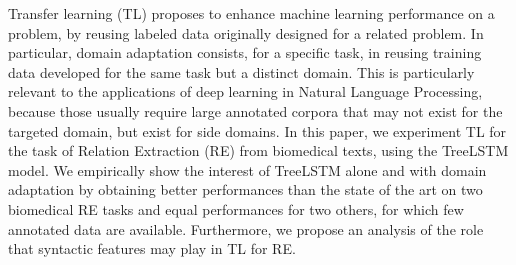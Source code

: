 Transfer learning (TL) proposes to enhance machine learning performance on a  problem, by reusing labeled data originally designed for a related problem. In particular, domain adaptation consists, for a specific task, in reusing training data developed for the same task but a distinct domain. This is particularly relevant to the applications of deep learning in Natural Language Processing, because those usually require large annotated corpora that may not exist for the targeted domain, but exist for side domains. In this paper, we experiment TL for the task of Relation Extraction (RE) from biomedical texts, using the TreeLSTM model. We empirically show the interest of TreeLSTM alone and with domain adaptation by obtaining better performances than the state of the art on two biomedical RE tasks and equal performances for two others, for which few annotated data are available. Furthermore, we propose an analysis of the role that syntactic features may play in TL for RE.
